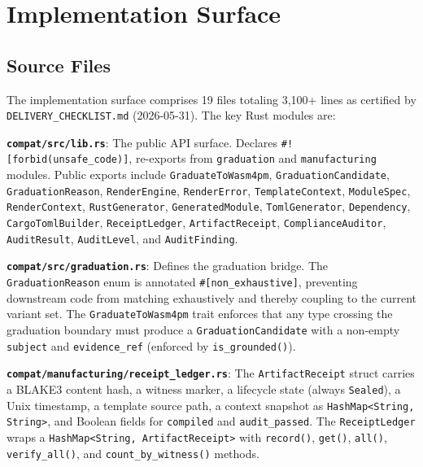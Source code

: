 
\section{Implementation Surface}
\label{sec:sources-wasm4pm-compat-implementation}

\subsection{Source Files}
\label{sec:sources-wasm4pm-compat-implementation-sources}

The implementation surface comprises 19 files totaling 3{,}100+ lines as certified by
\texttt{DELIVERY\_CHECKLIST.md} (2026-05-31). The key Rust modules are:

\textbf{\texttt{compat/src/lib.rs}}: The public API surface. Declares \texttt{\#![forbid(unsafe\_code)]},
re-exports from \texttt{graduation} and \texttt{manufacturing} modules. Public exports
include \texttt{GraduateToWasm4pm}, \texttt{GraduationCandidate}, \texttt{GraduationReason},
\texttt{RenderEngine}, \texttt{RenderError}, \texttt{TemplateContext}, \texttt{ModuleSpec},
\texttt{RenderContext}, \texttt{RustGenerator}, \texttt{GeneratedModule},
\texttt{TomlGenerator}, \texttt{Dependency}, \texttt{CargoTomlBuilder},
\texttt{ReceiptLedger}, \texttt{ArtifactReceipt}, \texttt{ComplianceAuditor},
\texttt{AuditResult}, \texttt{AuditLevel}, and \texttt{AuditFinding}.

\textbf{\texttt{compat/src/graduation.rs}}: Defines the graduation bridge. The
\texttt{GraduationReason} enum is annotated \texttt{\#[non\_exhaustive]}, preventing
downstream code from matching exhaustively and thereby coupling to the current variant
set. The \texttt{GraduateToWasm4pm} trait enforces that any type crossing the graduation
boundary must produce a \texttt{GraduationCandidate} with a non-empty \texttt{subject}
and \texttt{evidence\_ref} (enforced by \texttt{is\_grounded()}).

\textbf{\texttt{compat/manufacturing/receipt\_ledger.rs}}: The \texttt{ArtifactReceipt}
struct carries a BLAKE3 content hash, a witness marker, a lifecycle state (always
\texttt{Sealed}), a Unix timestamp, a template source path, a context snapshot as
\texttt{HashMap<String, String>}, and Boolean fields for \texttt{compiled} and
\texttt{audit\_passed}. The \texttt{ReceiptLedger} wraps a \texttt{HashMap<String,
ArtifactReceipt>} with \texttt{record()}, \texttt{get()}, \texttt{all()},
\texttt{verify\_all()}, and \texttt{count\_by\_witness()} methods.

